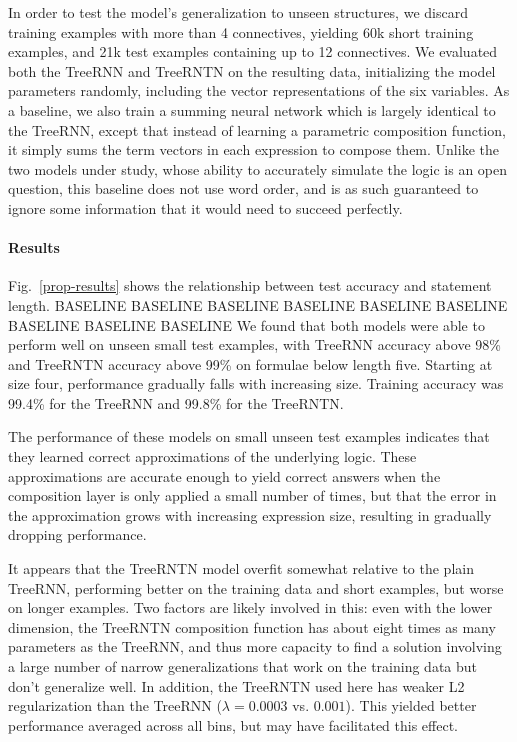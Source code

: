 In order to test the model's generalization to unseen structures, we discard
training examples with more than 4 connectives, yielding 60k short training examples,
and 21k test examples containing up to 12 connectives.
We evaluated both the TreeRNN and TreeRNTN on the resulting data, initializing the model parameters randomly,
including the vector representations of the six variables. 
As a baseline, we also train a summing neural network
which is largely identical to the TreeRNN, except that instead of learning a parametric composition function,
it simply sums the term vectors in each expression to compose them. Unlike the two models under study,
whose ability to accurately simulate the logic is an open question, this baseline does not use word order,
and is as such guaranteed to ignore some information that it would need to succeed perfectly.

\paragraph{Results} Fig.~\ref{prop-results} shows the relationship
between test accuracy and statement length. BASELINE BASELINE
 BASELINE BASELINE BASELINE BASELINE BASELINE BASELINE BASELINE   We found that both 
models were able to perform well on unseen small test examples, 
with TreeRNN accuracy above
98\% and TreeRNTN accuracy above 99\% on formulae below length five.
Starting at size four, performance gradually falls with increasing
size. Training accuracy was 99.4\% for the TreeRNN and 99.8\% for the TreeRNTN.

The performance of these models on small unseen test examples
indicates that they learned correct approximations of the underlying
logic. These approximations are accurate enough to yield
correct answers when the composition layer is only applied a small
number of times, but that the error in the approximation grows with
increasing expression size, resulting in gradually dropping performance. 


It appears that the TreeRNTN model overfit somewhat relative to the plain TreeRNN,
performing better on the training data and short examples, but worse on longer
examples. Two factors are likely involved in this: even with the lower dimension,
the TreeRNTN composition function has about eight times as many parameters as the
TreeRNN, and thus more capacity to find a solution involving a large number of narrow 
generalizations that work on the training data but don't generalize well. In addition,
the TreeRNTN used here has weaker L2 regularization than the 
TreeRNN ($\lambda = 0.0003$ vs. $0.001$). This
yielded better performance averaged across all bins, but may have facilitated this effect.

